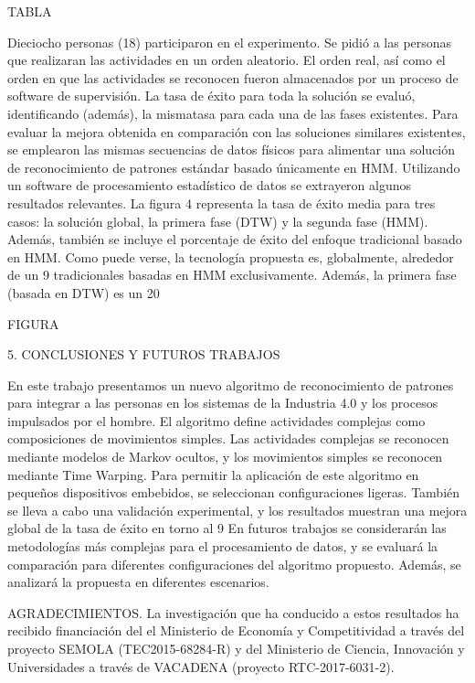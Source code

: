 TABLA

Dieciocho personas (18) participaron en el experimento. Se pidió a las personas que realizaran las actividades en un orden aleatorio. El orden real, así como el orden en que las actividades se reconocen fueron almacenados por un proceso de software de supervisión. La tasa de éxito para toda la solución se evaluó, identificando (además), la mismatasa para cada una de las fases existentes.
Para evaluar la mejora obtenida en comparación con las soluciones similares existentes, se emplearon las mismas secuencias de datos físicos para alimentar una solución de reconocimiento de patrones estándar basado únicamente en HMM. Utilizando un software de procesamiento estadístico de datos se extrayeron algunos resultados relevantes.
La figura 4 representa la tasa de éxito media para tres casos: la solución global, la primera fase (DTW) y la segunda fase (HMM). Además, también se incluye el porcentaje de éxito del enfoque tradicional basado en HMM. Como puede verse, la tecnología propuesta es, globalmente, alrededor de un 9%
tradicionales basadas en HMM exclusivamente. Además, la primera fase (basada en DTW) es un 20%

FIGURA

5. CONCLUSIONES Y FUTUROS TRABAJOS

En este trabajo presentamos un nuevo algoritmo de reconocimiento de patrones para integrar a las personas en los sistemas de la Industria 4.0 y los procesos impulsados por el hombre. El algoritmo define actividades complejas
como composiciones de movimientos simples. Las actividades complejas se reconocen mediante modelos de Markov ocultos, y los movimientos simples se reconocen mediante Time Warping. Para permitir la aplicación de este algoritmo en pequeños dispositivos embebidos, se seleccionan configuraciones ligeras. También se lleva a cabo una validación experimental, y los resultados muestran una mejora global de la tasa de éxito en torno al 9%
En futuros trabajos se considerarán las metodologías más complejas para el procesamiento de datos, y se evaluará la comparación para diferentes configuraciones del algoritmo propuesto. Además, se analizará la propuesta en diferentes escenarios.

AGRADECIMIENTOS. La investigación que ha conducido a estos resultados ha recibido financiación del el Ministerio de Economía y Competitividad a través del proyecto SEMOLA (TEC2015-68284-R) y del Ministerio de Ciencia, Innovación y Universidades a través de VACADENA (proyecto RTC-2017-6031-2).